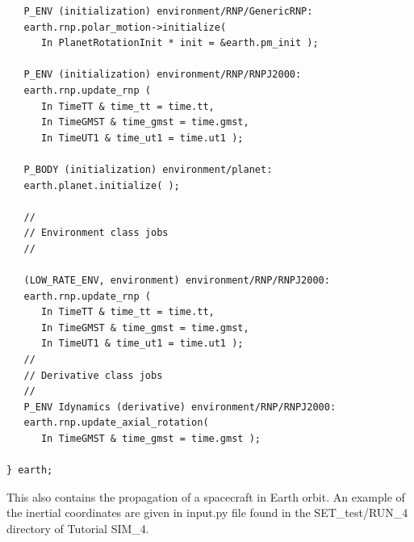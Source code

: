 \begin{verbatim}
   P_ENV (initialization) environment/RNP/GenericRNP:
   earth.rnp.polar_motion->initialize(
      In PlanetRotationInit * init = &earth.pm_init );

   P_ENV (initialization) environment/RNP/RNPJ2000:
   earth.rnp.update_rnp (
      In TimeTT & time_tt = time.tt,
      In TimeGMST & time_gmst = time.gmst,
      In TimeUT1 & time_ut1 = time.ut1 ); 
   
   P_BODY (initialization) environment/planet:
   earth.planet.initialize( );

   //
   // Environment class jobs
   //
   
   (LOW_RATE_ENV, environment) environment/RNP/RNPJ2000:
   earth.rnp.update_rnp (
      In TimeTT & time_tt = time.tt,
      In TimeGMST & time_gmst = time.gmst,
      In TimeUT1 & time_ut1 = time.ut1 );
   //
   // Derivative class jobs
   //
   P_ENV Idynamics (derivative) environment/RNP/RNPJ2000:
   earth.rnp.update_axial_rotation(
      In TimeGMST & time_gmst = time.gmst );

} earth;
\end{verbatim}
This also contains the propagation of a spacecraft in Earth orbit.
An example of the inertial coordinates are given in input.py file found in the SET\_test/RUN\_4 directory of Tutorial SIM\_4.


